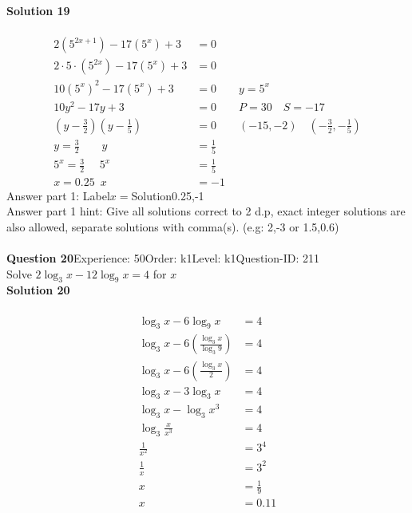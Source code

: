\documentclass{article}
\begin{document}
\noindent\textbf{Solution 19}\\[2pt]
\\[-35pt]\begin{align*}
2(5^{2x+1})-17(5^x)+3&=0\\[2pt]
2\!\cdot\!5\!\cdot\!(5^{2x})-17(5^x)+3&=0\\[2pt]
10(5^{x})^2-17(5^x)+3&=0\qquad y=5^x\\[2pt]
10y^2-17y+3&=0\qquad P=30 \quad S=-17\\[2pt]
\left(y-\displaystyle\frac{3}{2}\right)\left(y-\displaystyle\frac{1}{5}\right)&=0\qquad (-15,-2)\quad \left(-\displaystyle\frac{3}{2},-\displaystyle\frac{1}{5}\right)\\[2pt]
y=\displaystyle\frac{3}{2} \qquad y&=\displaystyle\frac{1}{5}\\[2pt]
5^x=\displaystyle\frac{3}{2}\hspace{16pt} 5^x&=\displaystyle\frac{1}{5}\\[2pt]
x=0.25 \hspace{6pt} x&=-1
\end{align*}
Answer part 1: \hspace{10pt}Label\hspace{10pt}$x=$\hspace{10pt}Solution\hspace{10pt}0.25,-1\\
Answer part 1 hint: \hspace{15pt}Give all solutions correct to 2 d.p, exact integer solutions are also allowed, separate solutions with comma(s).  (e.g:  2,-3 or 1.5,0.6)  \\
\\[4pt]
\noindent\textbf{Question 20}\hspace{20pt}Experience: 50\hspace{20pt}Order: k1\hspace{20pt}Level: k1\hspace{20pt}Question-ID: 211\\[2pt]
Solve $2\log_{3}x-12\log_{9}x=4$ for $x$\\[4pt]
\noindent\textbf{Solution 20}\\[2pt]
\\[-35pt]\begin{align*}
\log_{3}x-6\log_{9}x&=4\\[2pt]
\log_{3}x-6\left(\displaystyle\frac{\log_{3}x}{\log_{3}9}\right)&=4\\[2pt]
\log_{3}x-6\left(\displaystyle\frac{\log_{3}x}{2}\right)&=4\\[2pt]
\log_{3}x-3\log_{3}x&=4\\[2pt]
\log_{3}x-\log_{3}x^3&=4\\[2pt]
\log_{3}\displaystyle\frac{x}{x^3}&=4\\[2pt]
\displaystyle\frac{1}{x^2}&=3^4\\[2pt]
\displaystyle\frac{1}{x}&=3^2\\[2pt]
x&=\displaystyle\frac{1}{9}\\[2pt]
x&=0.11
\end{align*}
\end{document}
